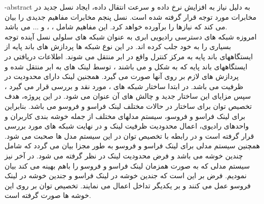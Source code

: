 
\fa-abstract{
به دلیل نیاز به افزایش نرخ داده و سرعت انتقال داده، ایجاد نسل جدید در مخابرات مورد  توجه قرار گرفته شده است. نسل پنجم مخابرات مفاهیم جدیدی را بیان می کند که نیازها را برآورده خواهد کرد.
این مفاهیم شامل 
،
 ،
 
و ... می باشد.\\
امروزه شبکه های دسترسی رادیویی ابری  به عنوان شبکه
های سلولی نسل آینده  توجه بسیاری را به خود جلب
کرده اند. در این نوع شبکه ها پردازش های باند پایه از
ایستگاههای باند پایه به مرکز کنترل واقع در ابر  منتقل می
شوند. اطلاعات دریافتی در ایستگاههای باند پایه که به
شکل  و   می باشند \cite{mobile} ، توسط لینک
های  به ابر منتقل شده و پردازش های لازم
بر روی آنها صورت می گیرد. 
 همجنین لینک  دارای محدودیت در ظرفیت می باشد. \newline
 در ابتدا ساختار
شبکه های  ،  مورد نقد و بررسی قرار می گیرد ، سپس
مزایای این ساختار جدید و چالش های آن عنوان می شود.
 در این پروژه، هدف تخصیص توان  برای ساختار  در حالات مختلف لینک فراسو و فروسو می باشد. 
بنابراین برای لینک فراسو و فروسو، سیستم مدلهای مختلف از جمله خوشه بندی کاربران و واحدهای رادیوی، اعمال محدودیت ظرفیت لینک  و در نهایت  شبکه های  مورد بررسی قرار گرفته است و در رابطه با تخصیص توان در این سیستم مدل ها صحبت می شود. \newline
همچنین سیستم مدلی برای لینک فراسو و فروسو به طور مجزا بیان می گردد که شامل چندین خوشه می باشد و فرض محدودیت لینک  در نظر گرفته می شود.\newline
در آخر نیز سیستم مدلی که به صورت همزمان لینک فراسو و فروسو را باهم بهینه می کند بیان نمودیم. فرض بر این است که جندین خوشه در لینک فراسو و جندین خوشه در لینک فروسو عمل می کنند و بر یکدیگر تداخل اعمال می نمایند. تخصیص توان بر روی این خوشه ها صورت گرفته است.
}
\AUTtitle
